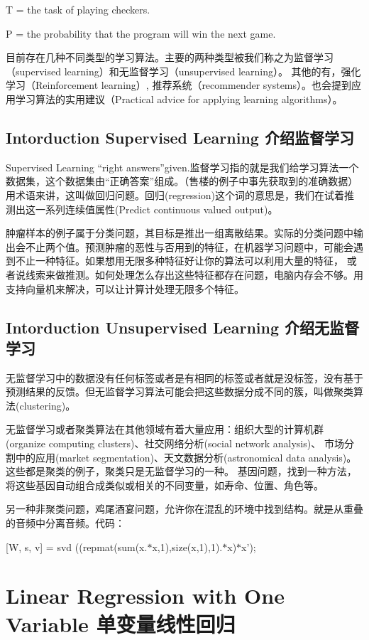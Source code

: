 \documentclass[UTF8]{ctexart}
\begin{document}
T = the task of playing checkers.

P = the probability that the program will win the next game.

目前存在几种不同类型的学习算法。主要的两种类型被我们称之为监督学习（supervised learning）和无监督学习（unsupervised learning）。
其他的有，强化学习（Reinforcement learning）, 推荐系统（recommender systems）。也会提到应用学习算法的实用建议（Practical advice for applying learning algorithms）。
\subsection{Intorduction Supervised Learning 介绍监督学习}
Supervised Learning ``right answers''given.监督学习指的就是我们给学习算法一个数据集，这个数据集由``正确答案''组成。（售楼的例子中事先获取到的准确数据）
用术语来讲，这叫做回归问题。回归(regression)这个词的意思是，我们在试着推测出这一系列连续值属性(Predict continuous valued output)。

肿瘤样本的例子属于分类问题，其目标是推出一组离散结果。实际的分类问题中输出会不止两个值。预测肿瘤的恶性与否用到的特征，在机器学习问题中，可能会遇到不止一种特征。如果想用无限多种特征好让你的算法可以利用大量的特征，
或者说线索来做推测。如何处理怎么存出这些特征都存在问题，电脑内存会不够。用支持向量机来解决，可以让计算计处理无限多个特征。
\subsection{Intorduction Unsupervised Learning 介绍无监督学习}
无监督学习中的数据没有任何标签或者是有相同的标签或者就是没标签，没有基于预测结果的反馈。但无监督学习算法可能会把这些数据分成不同的簇，叫做聚类算法(clustering)。

无监督学习或者聚类算法在其他领域有着大量应用：组织大型的计算机群(organize computing clusters)、社交网络分析(social network analysis)、
市场分割中的应用(market segmentation)、天文数据分析(astronomical data analysis)。这些都是聚类的例子，聚类只是无监督学习的一种。
基因问题，找到一种方法，将这些基因自动组合成类似或相关的不同变量，如寿命、位置、角色等。

另一种非聚类问题，鸡尾酒宴问题，允许你在混乱的环境中找到结构。就是从重叠的音频中分离音频。代码：

[W, s, v] = svd ((repmat(sum(x.$*$x,1),size(x,1),1).$*$x)$*$x');

\section{Linear Regression with One Variable 单变量线性回归}
\end{document}

